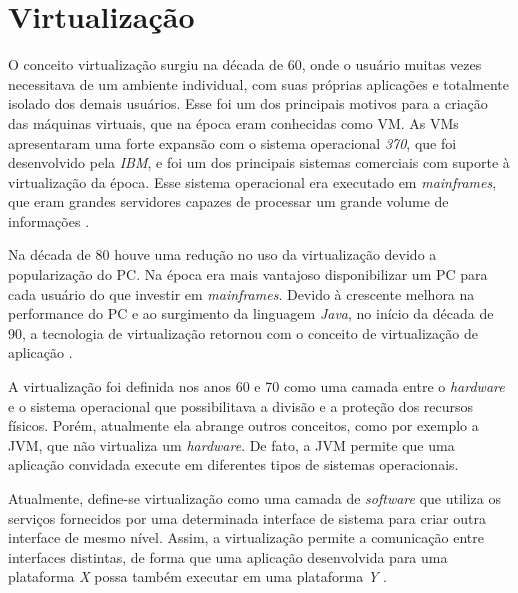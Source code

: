 \chapter{Virtualização}
\label{cap:virtualizacao}

O conceito virtualização surgiu na década de 60, onde o usuário muitas vezes necessitava de um ambiente individual, 
com suas próprias aplicações e totalmente isolado dos demais usuários. Esse foi um dos principais motivos para a criação das máquinas 
virtuais, que na época eram conhecidas como \ac{VM}. As \ac{VM}s apresentaram uma forte expansão com o sistema operacional \textit{370}, que foi 
desenvolvido pela \textit{IBM}, e foi um dos principais sistemas comerciais com suporte à virtualização da época. Esse sistema operacional 
era executado em \textit{mainframes}, que eram grandes servidores capazes de processar um grande volume de informações \cite{laureano2008}. 

Na década de 80 houve uma redução no uso da virtualização devido a popularização do \ac{PC}. Na época era mais vantajoso disponibilizar 
um \ac{PC} para cada usuário do que investir em \textit{mainframes}. Devido à crescente melhora na performance do \ac{PC} e
ao surgimento da linguagem \textit{Java}, no início da década de 90, a tecnologia de virtualização retornou com o conceito de virtualização
de aplicação \cite{laureano2008}.

A virtualização foi definida nos anos 60 e 70 como uma camada entre o \textit{hardware} e o sistema operacional que possibilitava a 
divisão e a proteção dos recursos físicos. Porém, atualmente ela abrange outros conceitos, como por exemplo a \ac{JVM}, que não virtualiza
um \textit{hardware}. De fato, a \ac{JVM} permite que uma aplicação convidada execute em diferentes tipos de sistemas operacionais.

Atualmente, define-se virtualização como uma camada de \textit{software} que utiliza os serviços fornecidos por uma determinada interface de 
sistema para criar outra interface de mesmo nível. Assim, a virtualização permite a comunicação entre interfaces distintas, de forma que uma 
aplicação desenvolvida para uma plataforma \textit{X} possa também executar em uma plataforma \textit{Y} \cite{laureano2008}.

